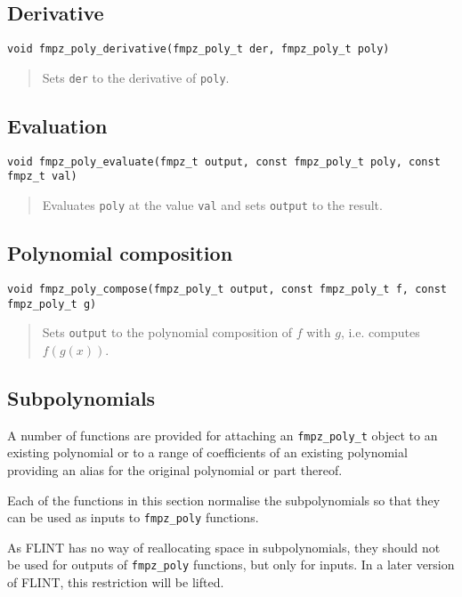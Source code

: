 \documentclass[a4paper,10pt]{article}
\newcommand{\code}{\lstinline}
\begin{document}
\subsection{Derivative}
\begin{lstlisting}
void fmpz_poly_derivative(fmpz_poly_t der, fmpz_poly_t poly) 
\end{lstlisting}
\begin{quote}
Sets \code{der} to the derivative of \code{poly}. 
\end{quote}

\subsection{Evaluation}
\begin{lstlisting}
void fmpz_poly_evaluate(fmpz_t output, const fmpz_poly_t poly, const fmpz_t val) 
\end{lstlisting}
\begin{quote}
Evaluates \code{poly} at the value \code{val} and sets \code{output} to the result. 
\end{quote}

\subsection{Polynomial composition}
\begin{lstlisting}
void fmpz_poly_compose(fmpz_poly_t output, const fmpz_poly_t f, const fmpz_poly_t g) 
\end{lstlisting}
\begin{quote}
Sets \code{output} to the polynomial composition of $f$ with $g$, i.e. computes $f(g(x))$.
\end{quote}

\subsection{Subpolynomials}
A number of functions are provided for attaching an \code{fmpz_poly_t} object to an existing polynomial or to a range of coefficients of an existing polynomial providing an alias for the original polynomial or part thereof. 

Each of the functions in this section normalise the subpolynomials so that they can be used as inputs to \code{fmpz_poly} functions. 

As FLINT has no way of reallocating space in subpolynomials, they should not be used for outputs of \code{fmpz_poly} functions, but only for inputs. In a later version of FLINT, this restriction will be lifted.
\end{document}
